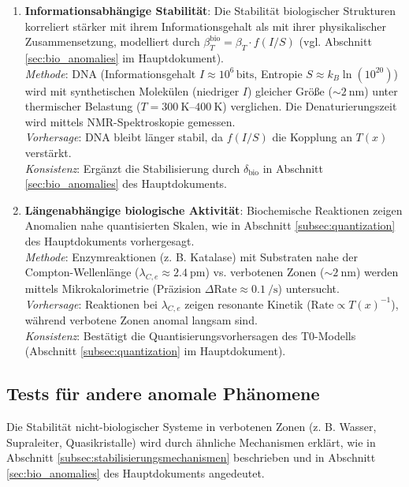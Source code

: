 \documentclass[12pt,a4paper]{article}
\newcommand{\Tfield}{T(x)}
\begin{document}
\begin{enumerate}
		\item \textbf{Informationsabhängige Stabilität}: Die Stabilität biologischer Strukturen korreliert stärker mit ihrem Informationsgehalt als mit ihrer physikalischer Zusammensetzung, modelliert durch $\beta_T^{\text{bio}} = \beta_T \cdot f(I/S)$ (vgl. Abschnitt \ref{sec:bio_anomalies} im Hauptdokument). \\
		\textit{Methode}: DNA (Informationsgehalt $I \approx 10^6 \, \text{bits}$, Entropie $S \approx k_B \ln(10^{20})$) wird mit synthetischen Molekülen (niedriger $I$) gleicher Größe ($\sim \SI{2}{\nano\meter}$) unter thermischer Belastung ($T = \SIrange{300}{400}{\kelvin}$) verglichen. Die Denaturierungszeit wird mittels NMR-Spektroskopie gemessen. \\
		\textit{Vorhersage}: DNA bleibt länger stabil, da $f(I/S)$ die Kopplung an $\Tfield$ verstärkt. \\
		\textit{Konsistenz}: Ergänzt die Stabilisierung durch $\delta_{\text{bio}}$ in Abschnitt \ref{sec:bio_anomalies} des Hauptdokuments.
		
		\item \textbf{Längenabhängige biologische Aktivität}: Biochemische Reaktionen zeigen Anomalien nahe quantisierten Skalen, wie in Abschnitt \ref{subsec:quantization} des Hauptdokuments vorhergesagt. \\
		\textit{Methode}: Enzymreaktionen (z. B. Katalase) mit Substraten nahe der Compton-Wellenlänge ($\lambda_{C,e} \approx \SI{2.4}{\pico\meter}$) vs. verbotenen Zonen ($\sim \SI{2}{\nano\meter}$) werden mittels Mikrokalorimetrie (Präzision $\Delta \text{Rate} \approx \SI{0.1}{\per\second}$) untersucht. \\
		\textit{Vorhersage}: Reaktionen bei $\lambda_{C,e}$ zeigen resonante Kinetik ($\text{Rate} \propto \Tfield^{-1}$), während verbotene Zonen anomal langsam sind. \\
		\textit{Konsistenz}: Bestätigt die Quantisierungsvorhersagen des T0-Modells (Abschnitt \ref{subsec:quantization} im Hauptdokument).
	\end{enumerate}
	
	\subsection{Tests für andere anomale Phänomene}
	
	Die Stabilität nicht-biologischer Systeme in verbotenen Zonen (z. B. Wasser, Supraleiter, Quasikristalle) wird durch ähnliche Mechanismen erklärt, wie in Abschnitt \ref{subsec:stabilisierungsmechanismen} beschrieben und in Abschnitt \ref{sec:bio_anomalies} des Hauptdokuments angedeutet.
	
\end{document}

